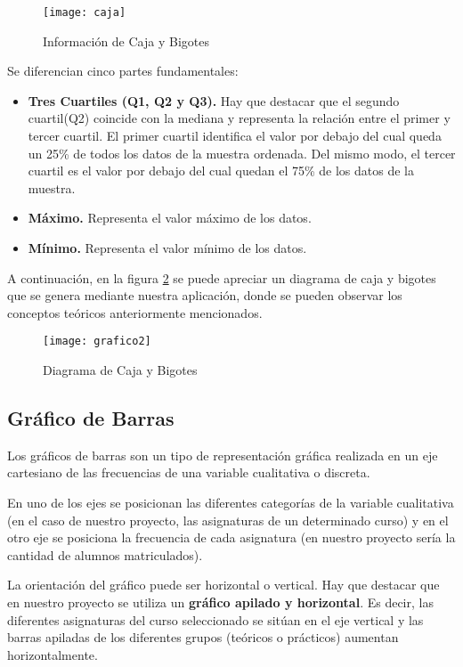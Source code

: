 	
	\begin{figure}%
		\centering
		\texttt{[image: caja]}
		\caption{Información de Caja y Bigotes}\label{fig:caja}
	\end{figure}
	
Se diferencian cinco partes fundamentales: 
\begin{itemize}
	\item 
	\textbf{Tres Cuartiles (Q1, Q2 y Q3).} Hay que destacar que el segundo cuartil(Q2) coincide con la mediana y representa la relación entre el primer y tercer cuartil. El primer cuartil identifica el valor por debajo del cual queda un 25\% de todos los datos de la muestra ordenada. Del mismo modo, el tercer cuartil es el valor por debajo del cual quedan el 75\% de los datos de la muestra.
	\item 
	\textbf{Máximo.} Representa el valor máximo de los datos.
	\item 
	\textbf{Mínimo.} Representa el valor mínimo de los datos.
\end{itemize}

A continuación, en la figura \ref{fig:grafico2} se puede apreciar un diagrama de caja y bigotes que se genera mediante nuestra aplicación, donde se pueden observar los conceptos teóricos anteriormente mencionados. 

\begin{figure}%
		\centering
		\texttt{[image: grafico2]}
		\caption{Diagrama de Caja y Bigotes}\label{fig:grafico2}
	\end{figure}


\subsection{Gráfico de Barras}

Los  gráficos de barras son un tipo de representación gráfica realizada en un eje cartesiano de las frecuencias de una variable cualitativa o discreta. \cite{ine}

En uno de los ejes se posicionan las diferentes categorías de la variable cualitativa (en el caso de nuestro proyecto, las asignaturas de un determinado curso) y en el otro eje se posiciona la frecuencia de cada asignatura (en nuestro proyecto sería la cantidad de alumnos matriculados).

La orientación del gráfico puede ser horizontal o vertical. Hay que destacar que en nuestro proyecto se utiliza un \textbf{gráfico apilado y horizontal}. Es decir, las diferentes asignaturas del curso seleccionado se sitúan en el eje vertical y las barras apiladas de los diferentes grupos (teóricos o prácticos) aumentan horizontalmente.


